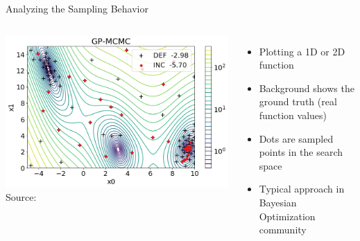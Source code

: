 \begin{frame}[c]{Analyzing the Sampling Behavior}


\begin{columns}
	
	\begin{center}
		\includegraphics[width=1.0\textwidth]{images/gpmcmc_branin_def_vs_inc.png}\\
		Source: 
	\end{center}
	
	
	\begin{itemize}
		\item Plotting a 1D or 2D function
		\item Background shows the ground truth (real function values)
		\item Dots are sampled points in the search space\\
		
		\item Typical approach in Bayesian Optimization community
	\end{itemize}
	
\end{columns}

\end{frame}
